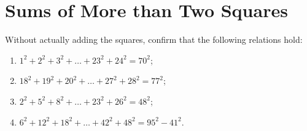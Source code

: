 \section{Sums of More than Two Squares}

\begin{exercise}
    Without actually adding the squares, confirm that the following relations hold:
    \begin{enumerate}
        \item $1^2 + 2^2 + 3^2 + \dots + 23^2 + 24^2 = 70^2$;
        \item $18^2 + 19^2 + 20^2 + \dots + 27^2 + 28^2 = 77^2$;
        \item $2^2 + 5^2 + 8^2 + \dots + 23^2 + 26^2 = 48^2$;
        \item $6^2 + 12^2 + 18^2 + \dots + 42^2 + 48^2 = 95^2 - 41^2$.\\
    \end{enumerate}
\end{exercise}

